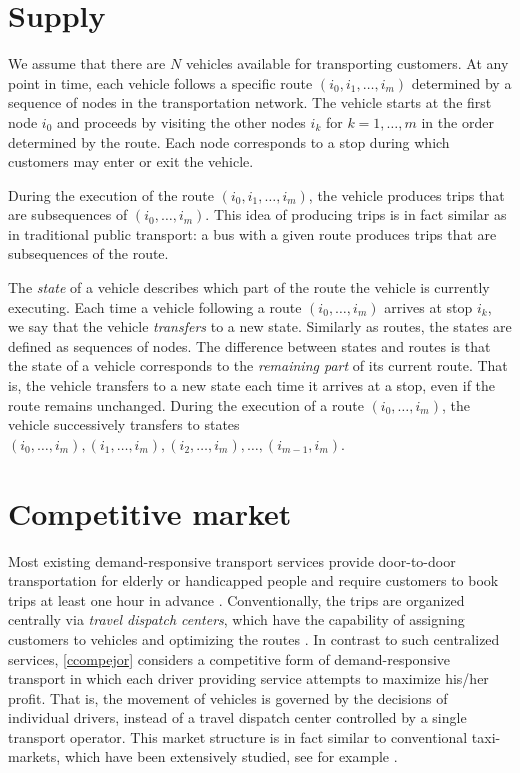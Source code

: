 \documentclass[dissertation,draft*]{aaltoseries}
\begin{document}
\section{Supply}
\label{vehiclemovements}
We assume that there are $N$ vehicles available for transporting customers. 
At any point in time, each vehicle follows a specific route $(i_0,i_1,\ldots,i_m)$ 
determined by a sequence of nodes in the transportation network.
The vehicle starts at the first node $i_0$ and proceeds by visiting the other nodes $i_k$
for $k=1,\ldots,m$ in the order determined by the route.
Each node corresponds to a stop during which customers may enter or exit the vehicle.

During the execution of the route $(i_0,i_1,\ldots,i_m)$, the vehicle produces
trips that are subsequences of $(i_0,\ldots, i_m)$. This idea of producing trips 
is in fact similar as in traditional public transport: a bus with a given route 
produces trips that are subsequences of the route.

The \emph{state} of a vehicle describes which part of the route the vehicle is currently executing.
Each time a vehicle following a route $(i_0,\ldots,i_m)$ arrives at stop $i_k$, 
we say that the vehicle \emph{transfers} to a new state.
Similarly as routes, the states are defined as sequences of nodes.
The difference between states and routes
is that the state of a vehicle corresponds to the \emph{remaining part} of its current route. 
That is, the vehicle transfers to a new state each time it arrives at a stop, even if the route remains unchanged.
During the execution of a route $(i_0,\ldots,i_m)$, the vehicle successively transfers to states 
$(i_0,\ldots,i_m),(i_1,\ldots,i_m),(i_2,\ldots,i_m),\ldots,(i_{m-1},i_m)$.


\section{Competitive market}
\label{compdescription}
Most existing demand-responsive transport services provide door-to-door transportation for elderly or handicapped people
and require customers to book trips at least one hour in advance \citep{cordeau05,jouko}.
Conventionally, the trips are organized centrally via \emph{travel dispatch centers}, which have the capability of
assigning customers to vehicles and optimizing the routes \citep{mageean}.
In contrast to such centralized services, \ref{ccompejor} considers a competitive form of demand-responsive transport in which 
each driver providing service attempts to maximize his/her profit. That is,
the movement of vehicles is governed by the decisions of individual drivers, 
instead of a travel dispatch center controlled by a single transport operator.
This market structure is in fact similar to conventional taxi-markets, which have been extensively studied, see for example 
\citep{hackner1995,arnott1996,cairns1996,flores-guri2003,lagos2003,wong2005,matsushima2006,fernandez2006,moore2006,yang2002,yang2005,yang2010}.
\end{document}
